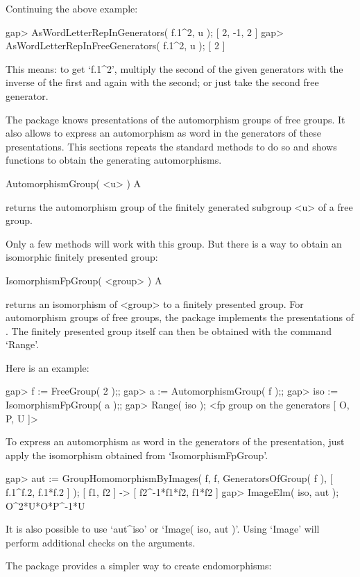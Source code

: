Continuing the above example:

\beginexample
gap> AsWordLetterRepInGenerators( f.1^2, u );    
[ 2, -1, 2 ]
gap> AsWordLetterRepInFreeGenerators( f.1^2, u );
[ 2 ]
\endexample

This means: to get `f.1^2', multiply the second of the given generators
with the inverse of the first and again with the second; or just take
the second free generator.


The {\FGA} package knows presentations of the automorphism groups of free
groups. It also allows to express an automorphism as word in the
generators of these presentations.
This sections repeats the {\GAP} standard methods to do so and shows
functions to obtain the generating automorphisms.

\>AutomorphismGroup( <u> ) A

returns the automorphism group of the finitely generated subgroup <u>
of a free group.

Only a few methods will work with this group. But there is a way to
obtain an isomorphic finitely presented group:

\>IsomorphismFpGroup( <group> ) A

returns an isomorphism of <group> to a finitely presented group.  
For automorphism groups of free groups, the {\FGA} package implements
the presentations of \cite{Neumann33}.
The finitely presented group itself can then be obtained with the
command `Range'.

Here is an example:

\beginexample
gap> f := FreeGroup( 2 );;
gap> a := AutomorphismGroup( f );;
gap> iso := IsomorphismFpGroup( a );;
gap> Range( iso );
<fp group on the generators [ O, P, U ]>
\endexample

To express an automorphism as word in the generators of the
presentation, just apply the isomorphism obtained from
`IsomorphismFpGroup'.

\beginexample
gap> aut := GroupHomomorphismByImages( f, f,
               GeneratorsOfGroup( f ), [ f.1^f.2, f.1*f.2 ] );
[ f1, f2 ] -> [ f2^-1*f1*f2, f1*f2 ]
gap> ImageElm( iso, aut );
O^2*U*O*P^-1*U
\endexample

It is also possible to use `aut^iso' or `Image( iso, aut )'.
Using `Image' will perform additional checks on the arguments.

The {\FGA} package provides a simpler way to create endomorphisms:


